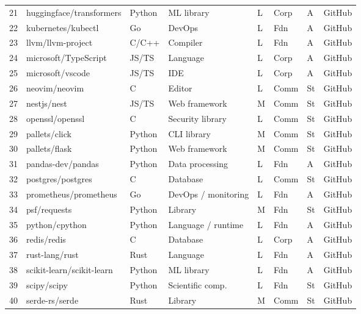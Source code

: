 \begin{landscape}
\begin{longtable}{clllllll}
21  & huggingface/transformers     & Python & ML library         & L & Corp & A  & GitHub \\
22  & kubernetes/kubectl           & Go     & DevOps             & L & Fdn  & A  & GitHub \\
23  & llvm/llvm-project            & C/C++  & Compiler           & L & Fdn  & A  & GitHub \\
24  & microsoft/TypeScript         & JS/TS  & Language           & L & Corp & A  & GitHub \\
25  & microsoft/vscode             & JS/TS  & IDE                & L & Corp & A  & GitHub \\
26  & neovim/neovim                & C      & Editor             & L & Comm & St & GitHub \\
27  & nestjs/nest                  & JS/TS  & Web framework      & M & Comm & St & GitHub \\
28  & openssl/openssl              & C      & Security library   & L & Comm & St & GitHub \\
29  & pallets/click                & Python & CLI library        & M & Comm & St & GitHub \\
30  & pallets/flask                & Python & Web framework      & M & Comm & St & GitHub \\
31  & pandas-dev/pandas            & Python & Data processing    & L & Fdn  & A  & GitHub \\
32  & postgres/postgres            & C      & Database           & L & Comm & St & GitHub \\
33  & prometheus/prometheus        & Go     & DevOps / monitoring& L & Fdn  & A  & GitHub \\
34  & psf/requests                 & Python & Library            & M & Fdn  & St & GitHub \\
35  & python/cpython               & Python & Language / runtime & L & Fdn  & A  & GitHub \\
36  & redis/redis                  & C      & Database           & L & Corp & A  & GitHub \\
37  & rust-lang/rust               & Rust   & Language           & L & Fdn  & A  & GitHub \\
38  & scikit-learn/scikit-learn    & Python & ML library         & L & Fdn  & A  & GitHub \\
39  & scipy/scipy                  & Python & Scientific comp.   & L & Fdn  & St & GitHub \\
40  & serde-rs/serde               & Rust   & Library            & M & Comm & St & GitHub \\

\end{longtable}
\end{landscape}
